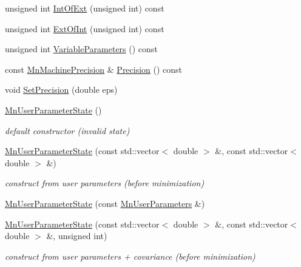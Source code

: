 \begin{DoxyCompactItemize}
\item 
unsigned int \mbox{\hyperlink{classROOT_1_1Minuit2_1_1MnUserParameterState_ab07f3ff917c70471b327243764aaad83}{Int\+Of\+Ext}} (unsigned int) const
\item 
unsigned int \mbox{\hyperlink{classROOT_1_1Minuit2_1_1MnUserParameterState_a9ab7bee2faaac9a607d090eb11926150}{Ext\+Of\+Int}} (unsigned int) const
\item 
unsigned int \mbox{\hyperlink{classROOT_1_1Minuit2_1_1MnUserParameterState_a8226cef71821d2558f31570f002631a4}{Variable\+Parameters}} () const
\item 
const \mbox{\hyperlink{classROOT_1_1Minuit2_1_1MnMachinePrecision}{Mn\+Machine\+Precision}} \& \mbox{\hyperlink{classROOT_1_1Minuit2_1_1MnUserParameterState_aff32da1a78b79f578541e42e91e37563}{Precision}} () const
\item 
void \mbox{\hyperlink{classROOT_1_1Minuit2_1_1MnUserParameterState_aab7787768e533471839387ef51a75cbb}{Set\+Precision}} (double eps)
\item 
\mbox{\hyperlink{classROOT_1_1Minuit2_1_1MnUserParameterState_aa327732c14a8771b3ae0cb5a67bba9f7}{Mn\+User\+Parameter\+State}} ()
\begin{DoxyCompactList}\small\item\em default constructor (invalid state) \end{DoxyCompactList}\item 
\mbox{\hyperlink{classROOT_1_1Minuit2_1_1MnUserParameterState_a75f83d5752afc69f1e55838f8446880a}{Mn\+User\+Parameter\+State}} (const std\+::vector$<$ double $>$ \&, const std\+::vector$<$ double $>$ \&)
\begin{DoxyCompactList}\small\item\em construct from user parameters (before minimization) \end{DoxyCompactList}\item 
\mbox{\hyperlink{classROOT_1_1Minuit2_1_1MnUserParameterState_aa4a32c2e51a89c2feca7a376972f1ff5}{Mn\+User\+Parameter\+State}} (const \mbox{\hyperlink{classROOT_1_1Minuit2_1_1MnUserParameters}{Mn\+User\+Parameters}} \&)
\item 
\mbox{\hyperlink{classROOT_1_1Minuit2_1_1MnUserParameterState_a146a0e2f845431830d795b919bb8f594}{Mn\+User\+Parameter\+State}} (const std\+::vector$<$ double $>$ \&, const std\+::vector$<$ double $>$ \&, unsigned int)
\begin{DoxyCompactList}\small\item\em construct from user parameters + covariance (before minimization) \end{DoxyCompactList}\item 

\end{DoxyCompactItemize}
